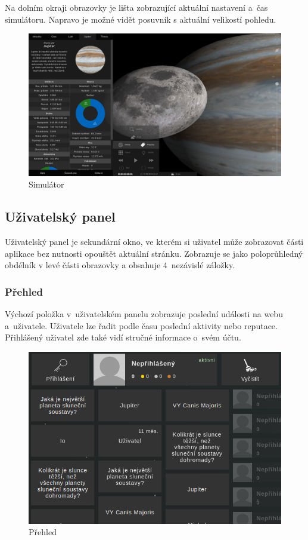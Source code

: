 \documentclass[a4paper,12pt]{article}
\begin{document}
Na dolním okraji obrazovky je lišta zobrazující aktuální nastavení a~čas simulátoru. Napravo je možné vidět posuvník s aktuální velikostí pohledu.

\begin{figure}[H]
\begin{center}
\includegraphics[width=450pt]{Images/Simulator.png}
\caption{Simulátor}
\label{BodiesList}
\end{center}
\end{figure}

\subsection{Uživatelský panel}

Uživatelský panel je sekundární okno, ve kterém si uživatel může zobrazovat části aplikace bez nutnosti opouštět aktuální stránku. Zobrazuje se jako poloprůhledný obdélník v levé části obrazovky a obsahuje 4~nezávislé záložky.

\subsubsection{Přehled}

Výchozí položka v~uživatelském panelu zobrazuje poslední události na webu a~uživatele. Uživatele lze řadit podle času poslední aktivity nebo reputace. Přihlášený uživatel zde také vidí stručné informace o~svém účtu.

\begin{figure}[H]
\begin{center}
\includegraphics[width=350pt]{Images/Overview.png}
\caption{Přehled}
\label{BodiesList}
\end{center}
\end{figure}
\end{document}
